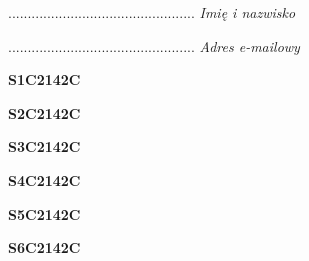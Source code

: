 \begin{turn}{90}\begin{minipage}{\linewidth} \vspace{20mm} ................................................  \textit{Imię i nazwisko}\end{minipage}\end{turn}

\begin{turn}{90}\begin{minipage}{\linewidth} \vspace{20mm} ................................................  \textit{Adres e-mailowy}\end{minipage}\end{turn}

\begin{turn}{90}\huge \begin{minipage}{\linewidth} \vspace{10mm}\textbf{S1C2142C}\end{minipage}\end{turn}

\begin{turn}{90}\huge \begin{minipage}{\linewidth} \vspace{10mm}\textbf{S2C2142C}\end{minipage}\end{turn}

\begin{turn}{90}\huge \begin{minipage}{\linewidth} \vspace{10mm}\textbf{S3C2142C}\end{minipage}\end{turn}

\begin{turn}{90}\huge \begin{minipage}{\linewidth} \vspace{10mm}\textbf{S4C2142C}\end{minipage}\end{turn}

\begin{turn}{90}\huge \begin{minipage}{\linewidth} \vspace{10mm}\textbf{S5C2142C}\end{minipage}\end{turn}

\begin{turn}{90}\huge \begin{minipage}{\linewidth} \vspace{10mm}\textbf{S6C2142C}\end{minipage}\end{turn}

